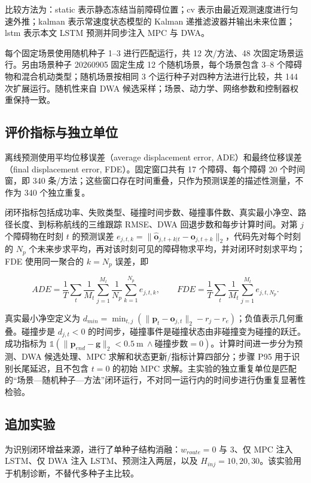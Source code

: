 \documentclass[11pt,a4paper]{ctexart}
\begin{document}
比较方法为：static 表示静态冻结当前障碍位置；cv 表示由最近观测速度进行匀速外推；kalman 表示常速度状态模型的 Kalman 递推滤波器并输出未来位置；lstm 表示本文 LSTM 预测并同步注入 MPC 与 DWA。

每个固定场景使用随机种子 1–3 进行匹配运行，共 12 次/方法、48 次固定场景运行。另由场景种子 20260905 固定生成 12 个随机场景，每个场景包含 3–8 个障碍物和混合机动类型；随机场景按相同 3 个运行种子对四种方法进行比较，共 144 次扩展运行。随机性来自 DWA 候选采样；场景、动力学、网络参数和控制器权重保持一致。

\subsection{评价指标与独立单位}

离线预测使用平均位移误差（average displacement error, ADE）和最终位移误差（final displacement error, FDE）。固定窗口共有 17 个障碍、每个障碍 20 个时间窗，即 340 条/方法；这些窗口存在时间重叠，只作为预测误差的描述性测量，不作为 340 个独立重复。

闭环指标包括成功率、失败类型、碰撞时间步数、碰撞事件数、真实最小净空、路径长度、到标称航线的三维跟踪 RMSE、DWA 回退步数和每步计算时间。对第 $j$ 个障碍物在时刻 $t$ 的预测误差 $e_{j,t,k}=\|\hat{\mathbf o}_{j,t+k|t}-\mathbf o_{j,t+k}\|_2$，代码先对每个时刻的 $N_p$ 个未来步求平均，再对该时刻可见的障碍物求平均，并对闭环时刻求平均；FDE 使用同一聚合的 $k=N_p$ 误差，即

\[
ADE=\frac{1}{T}\sum_t\frac{1}{M_t}\sum_{j=1}^{M_t}\frac{1}{N_p}\sum_{k=1}^{N_p}e_{j,t,k},\qquad
FDE=\frac{1}{T}\sum_t\frac{1}{M_t}\sum_{j=1}^{M_t}e_{j,t,N_p}.
\]

真实最小净空定义为 $d_{min}=\min_{t,j}(\|\mathbf p_t-\mathbf o_{j,t}\|_2-r_j-r_e)$；负值表示几何重叠。碰撞步是 $d_{j,t}<0$ 的时间步，碰撞事件是碰撞状态由非碰撞变为碰撞的跃迁。成功指标为 $\mathbb{1}(\|\mathbf p_{end}-\mathbf g\|_2<0.5\ \mathrm m\ \land\text{碰撞步数}=0)$。计算时间进一步分为预测、DWA 候选处理、MPC 求解和状态更新/指标计算四部分；步骤 P95 用于识别长尾延迟，且不包含 $t=0$ 的初始 MPC 求解。主实验的独立重复单位是匹配的“场景—随机种子—方法”闭环运行，不对同一运行内的时间步进行伪重复显著性检验。

\subsection{追加实验}

为识别闭环增益来源，进行了单种子结构消融：$w_{route}=0$ 与 3、仅 MPC 注入 LSTM、仅 DWA 注入 LSTM、预测注入两层，以及 $H_{inj}=10,20,30$。该实验用于机制诊断，不替代多种子主比较。
\end{document}
